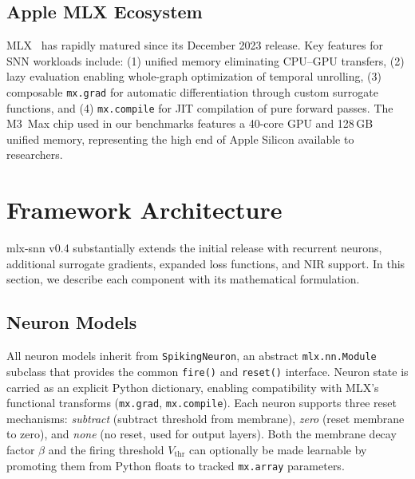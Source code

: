 \documentclass[11pt]{article}
\begin{document}
\subsection{Apple MLX Ecosystem}

MLX~\citep{mlx2023} has rapidly matured since its December 2023 release. Key features for SNN workloads include: (1) unified memory eliminating CPU--GPU transfers, (2) lazy evaluation enabling whole-graph optimization of temporal unrolling, (3) composable \texttt{mx.grad} for automatic differentiation through custom surrogate functions, and (4) \texttt{mx.compile} for JIT compilation of pure forward passes. The M3~Max chip used in our benchmarks features a 40-core GPU and 128\,GB unified memory, representing the high end of Apple Silicon available to researchers.

\section{Framework Architecture}

mlx-snn v0.4 substantially extends the initial release with recurrent neurons, additional surrogate gradients, expanded loss functions, and NIR support. In this section, we describe each component with its mathematical formulation.

\subsection{Neuron Models}
\label{sec:neurons}

All neuron models inherit from \texttt{SpikingNeuron}, an abstract \texttt{mlx.nn.Module} subclass that provides the common \texttt{fire()} and \texttt{reset()} interface. Neuron state is carried as an explicit Python dictionary, enabling compatibility with MLX's functional transforms (\texttt{mx.grad}, \texttt{mx.compile}). Each neuron supports three reset mechanisms: \textit{subtract} (subtract threshold from membrane), \textit{zero} (reset membrane to zero), and \textit{none} (no reset, used for output layers). Both the membrane decay factor $\beta$ and the firing threshold $V_\text{thr}$ can optionally be made learnable by promoting them from Python floats to tracked \texttt{mx.array} parameters.
\end{document}
